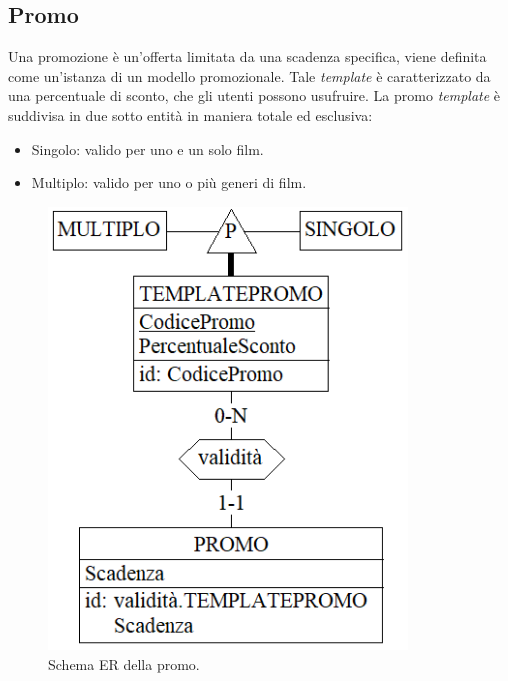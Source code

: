 \documentclass[a4paper,12pt]{report}
\begin{document}
\subsection{Promo}
Una promozione è un'offerta limitata da una scadenza specifica, viene definita come un'istanza di un modello promozionale. Tale \textit{template} è caratterizzato da una percentuale di sconto, che gli utenti possono usufruire. La promo \textit{template} è suddivisa in due sotto entità in maniera totale ed esclusiva:
\begin{itemize}
	\item Singolo: valido per uno e un solo film.
	\item Multiplo: valido per uno o più generi di film.
\end{itemize}
\begin{figure}[H]
	\centering
	\includegraphics[width=270pt]{ER/promo.png}
	\caption{Schema ER della promo.}
\end{figure}
\end{document}
